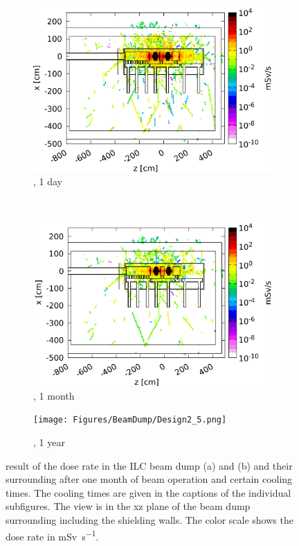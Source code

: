 \begin{figure}[!h]
\begin{subfigure}[b]{0.32\textwidth}
   \centering
    \includegraphics[width=\textwidth]{Figures/BeamDump/Design2_3.png}
   \caption{\designtwo, 1 day}
   \end{subfigure}\\
    \begin{subfigure}[b]{0.32\textwidth}
   \centering
    \includegraphics[width=\textwidth]{Figures/BeamDump/Design2_4.png}
   \caption{\designtwo, 1 month}
   \end{subfigure}
      \hfill
    \begin{subfigure}[b]{0.32\textwidth}
   \centering
    \texttt{[image: Figures/BeamDump/Design2\_5.png]}
   \caption{\designtwo, 1 year}
   \end{subfigure}
   \hfill
   \begin{minipage}{0.32\textwidth}
   \hfill
    \end{minipage}
   \caption[Dose rate in the ILC main beam dump after cooling times]{\fluka result of the dose rate in the ILC beam dump \designone (a) and \designtwo (b) and their surrounding after one month of beam operation and certain cooling times.
   The cooling times are given in the captions of the individual subfigures.
   The view is in the xz plane of the beam dump surrounding including the shielding walls.
   The color scale shows the dose rate in \si{\milli\sievert\per\second}.}
   \label{fig:BeamDumps:DoseRate}
\end{figure}